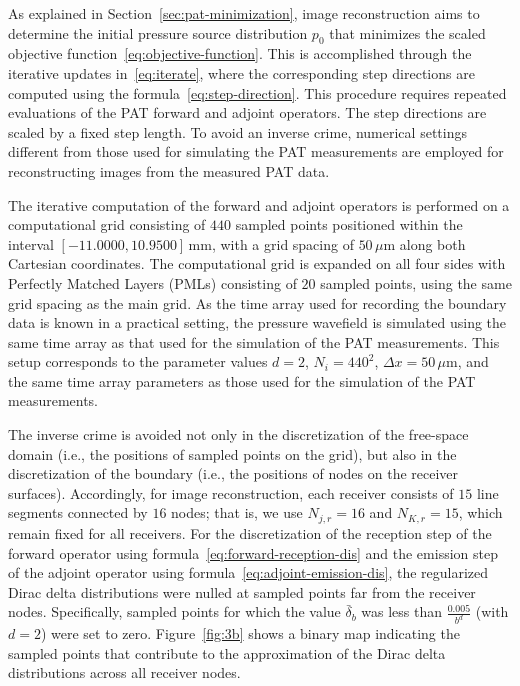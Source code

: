 \documentclass[11pt,reqno]{amsart}
\theoremstyle{remark}
\begin{document}
As explained in Section~\ref{sec:pat-minimization}, image reconstruction aims to determine the initial pressure source distribution \(p_0\) that minimizes the scaled objective function~\eqref{eq:objective-function}. This is accomplished through the iterative updates in~\eqref{eq:iterate}, where the corresponding step directions are computed using the formula~\eqref{eq:step-direction}. This procedure requires repeated evaluations of the PAT forward and adjoint operators. The step directions are scaled by a fixed step length. To avoid an inverse crime, numerical settings different from those used for simulating the PAT measurements are employed for reconstructing images from the measured PAT data.

The iterative computation of the forward and adjoint operators is performed on a computational grid consisting of \(440\) sampled points positioned within the interval \([-11.0000, 10.9500]\,\mathrm{mm}\), with a grid spacing of \(50\,\mu\mathrm{m}\) along both Cartesian coordinates. The computational grid is expanded on all four sides with Perfectly Matched Layers (PMLs) consisting of \(20\) sampled points, using the same grid spacing as the main grid. As the time array used for recording the boundary data is known in a practical setting, the pressure wavefield is simulated using the same time array as that used for the simulation of the PAT measurements. This setup corresponds to the parameter values \(d = 2\), \(N_i = 440^2\), \(\Delta x = 50\,\mu\mathrm{m}\), and the same time array parameters as those used for the simulation of the PAT measurements. 

The inverse crime is avoided not only in the discretization of the free-space domain (i.e., the positions of sampled points on the grid), but also in the discretization of the boundary (i.e., the positions of nodes on the receiver surfaces). Accordingly, for image reconstruction, each receiver consists of \(15\) line segments connected by \(16\) nodes; that is, we use \(N_{j,r} = 16\) and \(N_{K,r} = 15\), which remain fixed for all receivers. For the discretization of the reception step of the forward operator using formula~\ref{eq:forward-reception-dis} and the emission step of the adjoint operator using formula~\eqref{eq:adjoint-emission-dis}, the regularized Dirac delta distributions were nulled at sampled points far from the receiver nodes. Specifically, sampled points for which the value \(\bar{\delta}_b\) was less than \(\frac{0.005}{b^d}\) (with \(d = 2\)) were set to zero. Figure~\ref{fig:3b} shows a binary map indicating the sampled points that contribute to the approximation of the Dirac delta distributions across all receiver nodes.
\end{document}
